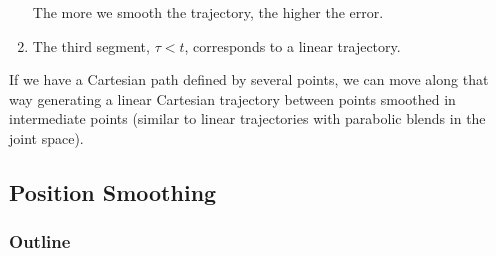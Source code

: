 \documentclass[10pt, aspectratio=169]{beamer}
\theoremstyle{remark}
\theoremstyle{definition}
\begin{document}
\begin{frame}[allowframebreaks]
\begin{enumerate}
    The more we smooth the trajectory, the higher the error.

    \item The third segment, $\tau < t$, corresponds to a linear trajectory.
\end{enumerate}

If we have a Cartesian path defined by several points, we can move along that way generating a linear Cartesian trajectory between points smoothed in intermediate points (similar to linear trajectories with parabolic blends in the joint space).

\end{frame}

\subsection{Position Smoothing}
\begin{frame}
	\frametitle{Outline} %
\end{frame}
\end{document}
